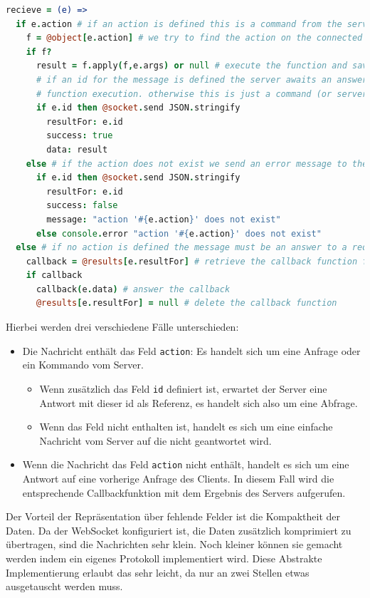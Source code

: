 \begin{lstlisting}[language=coffee]
recieve = (e) =>  
  if e.action # if an action is defined this is a command from the server
    f = @object[e.action] # we try to find the action on the connected object
    if f?
      result = f.apply(f,e.args) or null # execute the function and save the result
      # if an id for the message is defined the server awaits an answer with the result of the
      # function execution. otherwise this is just a command (or server-push)
      if e.id then @socket.send JSON.stringify 
        resultFor: e.id
        success: true
        data: result
    else # if the action does not exist we send an error message to the server
      if e.id then @socket.send JSON.stringify
        resultFor: e.id
        success: false
        message: "action '#{e.action}' does not exist"
      else console.error "action '#{e.action}' does not exist"
  else # if no action is defined the message must be an answer to a request
    callback = @results[e.resultFor] # retrieve the callback function for this action
    if callback 
      callback(e.data) # answer the callback
      @results[e.resultFor] = null # delete the callback function
\end{lstlisting}

Hierbei werden drei verschiedene Fälle unterschieden:

\begin{itemize}  
  \item Die Nachricht enthält das Feld \texttt{action}: Es handelt sich um eine
Anfrage oder ein Kommando vom Server.
  \begin{itemize}
    \item Wenn zusätzlich das Feld \texttt{id} definiert ist, erwartet der Server eine Antwort mit 
    dieser id als Referenz, es handelt sich also um eine Abfrage.
    \item Wenn das Feld nicht enthalten ist, handelt es sich um eine einfache Nachricht vom Server
    auf die nicht geantwortet wird.
  \end{itemize}
  \item Wenn die Nachricht das Feld \texttt{action} nicht enthält, handelt es sich um eine Antwort 
  auf eine vorherige Anfrage des Clients. In diesem Fall wird die entsprechende Callbackfunktion mit
  dem Ergebnis des Servers aufgerufen.
\end{itemize}

Der Vorteil der Repräsentation über fehlende Felder ist die Kompaktheit der Daten. Da der WebSocket
konfiguriert ist, die Daten zusätzlich komprimiert zu übertragen, sind die Nachrichten sehr klein.
Noch kleiner können sie gemacht werden indem ein eigenes Protokoll implementiert wird. Diese
Abstrakte Implementierung erlaubt das sehr leicht, da nur an zwei Stellen etwas ausgetauscht werden
muss.

